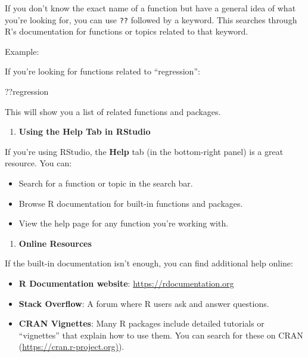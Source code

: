 \documentclass[
]{book}
\newenvironment{Shaded}{\begin{snugshade}}{\end{snugshade}}
\newcommand{\NormalTok}[1]{#1}
\providecommand{\tightlist}{%
  \setlength{\itemsep}{0pt}\setlength{\parskip}{0pt}}
\begin{document}
If you don't know the exact name of a function but have a general idea of what you're looking for, you can use \texttt{??} followed by a keyword. This searches through R's documentation for functions or topics related to that keyword.

Example:

If you're looking for functions related to ``regression'':

\begin{Shaded}
\begin{Highlighting}[]
\NormalTok{??regression}
\end{Highlighting}
\end{Shaded}

This will show you a list of related functions and packages.

\begin{enumerate}
\def\labelenumi{\arabic{enumi}.}
\setcounter{enumi}{3}
\tightlist
\item
  \textbf{Using the Help Tab in RStudio}
\end{enumerate}

If you're using RStudio, the \textbf{Help} tab (in the bottom-right panel) is a great resource. You can:

\begin{itemize}
\item
  Search for a function or topic in the search bar.
\item
  Browse R documentation for built-in functions and packages.
\item
  View the help page for any function you're working with.
\end{itemize}

\begin{enumerate}
\def\labelenumi{\arabic{enumi}.}
\setcounter{enumi}{4}
\tightlist
\item
  \textbf{Online Resources}
\end{enumerate}

If the built-in documentation isn't enough, you can find additional help online:

\begin{itemize}
\item
  \textbf{R Documentation website}: \url{https://rdocumentation.org}
\item
  \textbf{Stack Overflow}: A forum where R users ask and answer questions.
\item
  \textbf{CRAN Vignettes}: Many R packages include detailed tutorials or ``vignettes'' that explain how to use them. You can search for these on CRAN (\href{https://cran.r-project.org}{https://cran.r-project.org)}).
\end{itemize}
\end{document}
